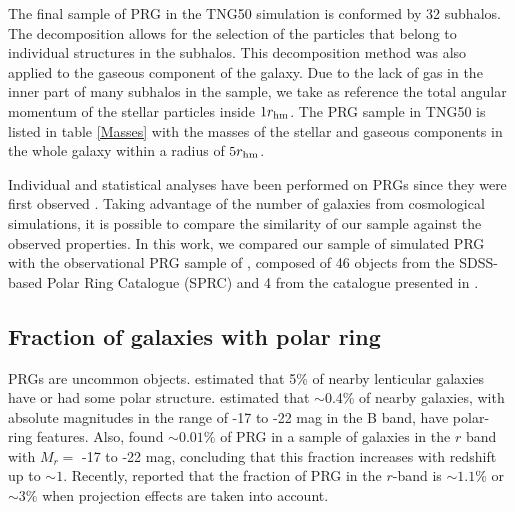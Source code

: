 \documentclass[fleqn,usenatbib]{mnras}
\begin{document}
The final sample of PRG in the TNG50 simulation is conformed by 32 subhalos. The decomposition allows for the selection of the particles that belong to individual structures in the subhalos. This decomposition method was also applied to the gaseous component of the galaxy. Due to the lack of gas in the inner part of many subhalos in the sample, we take as reference the total angular momentum of the stellar particles inside $1 r_{\rm hm}$. The PRG sample in TNG50 is listed in table \ref{Masses} with the masses of the stellar and gaseous components in the whole galaxy within a radius of $5 r_{\rm hm}$.


Individual and statistical analyses have been performed on PRGs since they were first observed \citep{1991_Whitmore,2002_Iodice,Reshetnikov_2015}. Taking advantage of the number of galaxies from cosmological simulations, it is possible to compare the similarity of our sample against the observed properties. In this work, we compared our sample of simulated PRG with the observational PRG sample of \citet{Reshetnikov_2015}, composed of 46 objects from the SDSS-based Polar Ring Catalogue (SPRC) \citep{2011_Moiseev} and 4 from the catalogue presented in \citet{1990_Whitmore}.

\subsection{Fraction of galaxies with polar ring}

PRGs are uncommon objects. \citet{1990_Whitmore} estimated that 5\% of near{by} lenticular galaxies have or had some polar structure. \citet{2011_Reshetnikov} estimated that $\sim$0.4\% of nearby galaxies, with absolute magnitudes in the range of -17 to -22 mag in the B band, have polar-ring features. Also, \citet{2022_Smirnov} found $\sim 0.01\%$ of PRG in a sample of galaxies in the $r$ band with $M_r =$ -17 to -22 mag, concluding that this fraction increases with redshift up to $ \sim 1$. Recently, \citet{2024_Mosenkov} reported that the fraction of PRG in the $r$-band is $\sim 1.1\%$ or $\sim  3\%$ when projection effects are taken into account.
\end{document}
